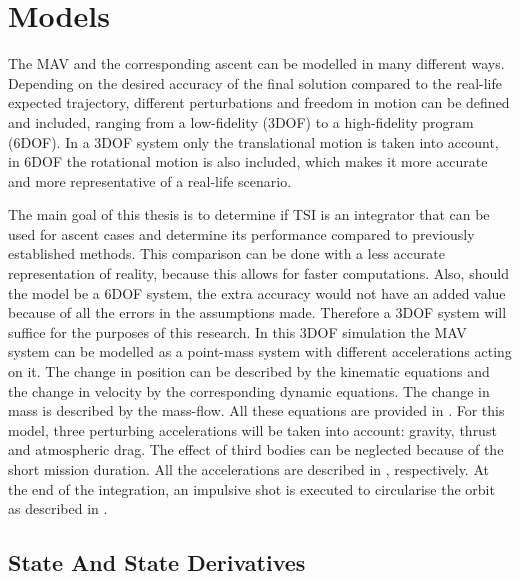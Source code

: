 

\chapter{Models} 
\label{ch:models}
The \ac{MAV} and the corresponding ascent can be modelled in many different ways. Depending on the desired accuracy of the final solution compared to the real-life expected trajectory, different perturbations and freedom in motion can be defined and included, ranging from a low-fidelity (3DOF) to a high-fidelity program (6DOF). In a 3DOF system only the translational motion is taken into account, in 6DOF the rotational motion is also included, which makes it more accurate and more representative of a real-life scenario.

The main goal of this thesis is to determine if \ac{TSI} is an integrator that can be used for ascent cases and determine its performance compared to previously established methods. This comparison can be done with a less accurate representation of reality, because this allows for faster computations. Also, should the model be a 6DOF system, the extra accuracy would not have an added value because of all the errors in the assumptions made. Therefore a 3DOF system will suffice for the purposes of this research. In this 3DOF simulation the \ac{MAV} system can be modelled as a point-mass system with different accelerations acting on it. The change in position can be described by the kinematic equations and the change in velocity by the corresponding dynamic equations. The change in mass is described by the mass-flow. All these equations are provided in . For this model, three perturbing accelerations will be taken into account: gravity, thrust and atmospheric drag. The effect of third bodies can be neglected because of the short mission duration. All the accelerations are described in , respectively. At the end of the integration, an impulsive shot is executed to circularise the orbit as described in .

\section{State And State Derivatives}
\label{sec:stateAndStateDerivatives}

